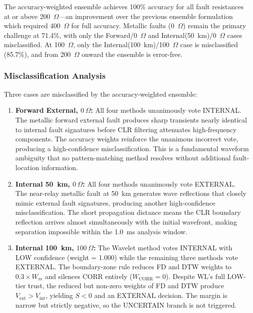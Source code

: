 \documentclass[journal]{IEEEtran}
\begin{document}
The accuracy-weighted ensemble achieves 100\% accuracy for all fault
resistances at or above 200~$\Omega$---an improvement over the previous
ensemble formulation which required 400~$\Omega$ for full accuracy.
Metallic faults (0~$\Omega$) remain the primary challenge at 71.4\%,
with only the Forward/0~$\Omega$ and Internal(50~km)/0~$\Omega$ cases
misclassified. At 100~$\Omega$, only the Internal(100~km)/100~$\Omega$
case is misclassified (85.7\%), and from 200~$\Omega$ onward the
ensemble is error-free.

\subsubsection{Misclassification Analysis}

Three cases are misclassified by the accuracy-weighted ensemble:

\begin{enumerate}
    \item \textbf{Forward External, $0~\Omega$:} All four methods
    unanimously vote INTERNAL. The metallic forward external fault
    produces sharp transients nearly identical to internal fault
    signatures before CLR filtering attenuates high-frequency
    components. The accuracy weights reinforce the unanimous incorrect
    vote, producing a high-confidence misclassification. This is a
    fundamental waveform ambiguity that no pattern-matching method
    resolves without additional fault-location information.

    \item \textbf{Internal 50~km, $0~\Omega$:} All four methods
    unanimously vote EXTERNAL. The near-relay metallic fault at 50~km
    generates wave reflections that closely mimic external fault
    signatures, producing another high-confidence misclassification.
    The short propagation distance means the CLR boundary reflection
    arrives almost simultaneously with the initial wavefront, making
    separation impossible within the 1.0~ms analysis window.

    \item \textbf{Internal 100~km, $100~\Omega$:} The Wavelet method
    votes INTERNAL with LOW confidence (weight = 1.000) while the
    remaining three methods vote EXTERNAL. The boundary-zone rule
    reduces FD and DTW weights to $0.3 \times W_m$ and silences CORR
    entirely ($W_{\text{CORR}} = 0$). Despite WL's full LOW-tier
    trust, the reduced but non-zero weights of FD and DTW produce
    $V_{\text{ext}} > V_{\text{int}}$, yielding $S < 0$ and an
    EXTERNAL decision. The margin is narrow but strictly negative,
    so the UNCERTAIN branch is not triggered.
\end{enumerate}
\end{document}
